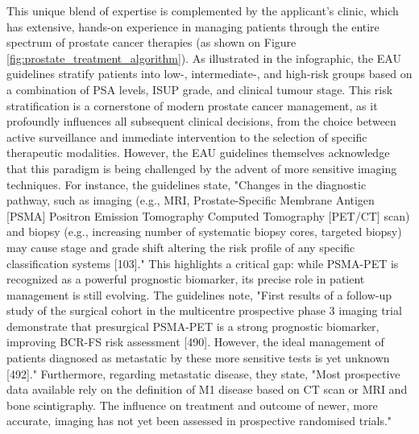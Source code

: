 \documentclass[11pt, a4paper]{article}
\begin{document}
This unique blend of expertise is complemented by the applicant's clinic, which has extensive, hands-on experience in managing patients through the entire spectrum of prostate cancer therapies (as shown on Figure \ref{fig:prostate_treatment_algorithm}). As illustrated in the infographic, the EAU guidelines stratify patients into low-, intermediate-, and high-risk groups based on a combination of PSA levels, ISUP grade, and clinical tumour stage. This risk stratification is a cornerstone of modern prostate cancer management, as it profoundly influences all subsequent clinical decisions, from the choice between active surveillance and immediate intervention to the selection of specific therapeutic modalities. However, the EAU guidelines themselves acknowledge that this paradigm is being challenged by the advent of more sensitive imaging techniques. For instance, the guidelines state, "Changes in the diagnostic pathway, such as imaging (e.g., MRI, Prostate-Specific Membrane Antigen [PSMA] Positron Emission Tomography Computed Tomography [PET/CT] scan) and biopsy (e.g., increasing number of systematic biopsy cores, targeted biopsy) may cause stage and grade shift altering the risk profile of any specific classification systems [103]." This highlights a critical gap: while PSMA-PET is recognized as a powerful prognostic biomarker, its precise role in patient management is still evolving. The guidelines note, "First results of a follow-up study of the surgical cohort in the multicentre prospective phase 3 imaging trial demonstrate that presurgical PSMA-PET is a strong prognostic biomarker, improving BCR-FS risk assessment [490]. However, the ideal management of patients diagnosed as metastatic by these more sensitive tests is yet unknown [492]." Furthermore, regarding metastatic disease, they state, "Most prospective data available rely on the definition of M1 disease based on CT scan or MRI and bone scintigraphy. The influence on treatment and outcome of newer, more accurate, imaging has not yet been assessed in prospective randomised trials."
\end{document}
